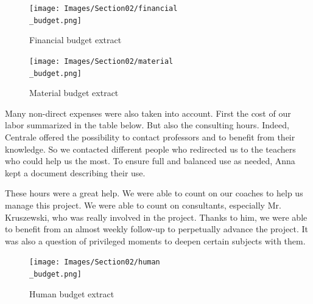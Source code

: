 \begin{figure}[ht]
    \centering
    \texttt{[image: Images/Section02/financial\\\_budget.png]}
    \caption{Financial budget extract}
    \label{fig:financialBudgetextract}
\end{figure}
\FloatBarrier

\begin{figure}[ht]
    \centering
    \texttt{[image: Images/Section02/material\\\_budget.png]}
    \caption{Material budget extract}
    \label{fig:materialBudgetextract}
\end{figure}
\FloatBarrier
Many non-direct expenses were also taken into account. First the cost of our labor summarized in the table below. But also the consulting hours. Indeed, Centrale offered the possibility to contact professors and to benefit from their knowledge. So we contacted different people who redirected us to the teachers who could help us the most. To ensure full and balanced use as needed, Anna kept a document describing their use. 

\bigbreak
These hours were a great help. We were able to count on our coaches to help us manage this project. We were able to count on consultants, especially Mr. Kruszewski, who was really involved in the project. Thanks to him, we were able to benefit from an almost weekly follow-up to perpetually advance the project. It was also a question of privileged moments to deepen certain subjects with them.

\begin{figure}[ht]
    \centering
    \texttt{[image: Images/Section02/human\\\_budget.png]}
    \caption{Human budget extract}
    \label{fig:humanBudget}
\end{figure}